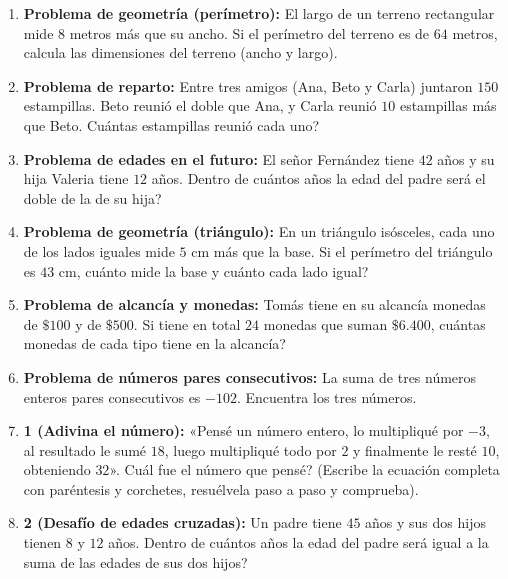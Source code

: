 \documentclass[12pt, letterpaper]{article}
\begin{document}
\begin{enumerate}[leftmargin=*, start=61]
  \item \medio{} \textbf{Problema de geometría (perímetro):} El largo de un terreno rectangular mide $8$ metros más que su ancho. Si el perímetro del terreno es de $64$ metros, calcula las dimensiones del terreno (ancho y largo).

  \item \medio{} \textbf{Problema de reparto:} Entre tres amigos (Ana, Beto y Carla) juntaron $150$ estampillas. Beto reunió el doble que Ana, y Carla reunió $10$ estampillas más que Beto. \textquestiondown Cuántas estampillas reunió cada uno?

  \item \dificil{} \textbf{Problema de edades en el futuro:} El señor Fernández tiene $42$ años y su hija Valeria tiene $12$ años. \textquestiondown Dentro de cuántos años la edad del padre será el doble de la de su hija?

  \item \dificil{} \textbf{Problema de geometría (triángulo):} En un triángulo isósceles, cada uno de los lados iguales mide $5$ cm más que la base. Si el perímetro del triángulo es $43$ cm, \textquestiondown cuánto mide la base y cuánto cada lado igual?

  \item \dificil{} \textbf{Problema de alcancía y monedas:} Tomás tiene en su alcancía monedas de $\$100$ y de $\$500$. Si tiene en total $24$ monedas que suman $\$6.400$, \textquestiondown cuántas monedas de cada tipo tiene en la alcancía?

  \item \dificil{} \textbf{Problema de números pares consecutivos:} La suma de tres números enteros pares consecutivos es $-102$. Encuentra los tres números.

  \item \dificil{} \textbf{ 1 (Adivina el número):} «Pensé un número entero, lo multipliqué por $-3$, al resultado le sumé $18$, luego multipliqué todo por $2$ y finalmente le resté $10$, obteniendo $32$». \textquestiondown Cuál fue el número que pensé? (Escribe la ecuación completa con paréntesis y corchetes, resuélvela paso a paso y comprueba).

  \item \dificil{} \textbf{ 2 (Desafío de edades cruzadas):} Un padre tiene $45$ años y sus dos hijos tienen $8$ y $12$ años. \textquestiondown Dentro de cuántos años la edad del padre será igual a la suma de las edades de sus dos hijos?
\end{enumerate}
\end{document}
